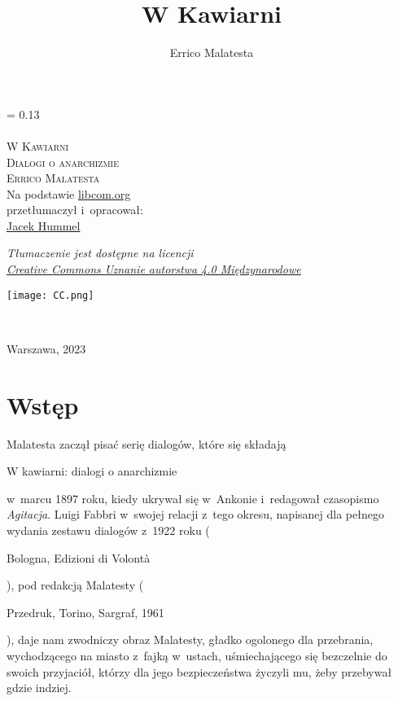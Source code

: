\documentclass[oneside,polish,11pt,sfheadings]{mwbk}
\begin{document}
\title{W Kawiarni}
\author{Errico Malatesta}


\DeclareRobustCommand{\cs}[1]{\texttt{\char`\\#1}}
\newlength{\tpheight}\setlength{\tpheight}{0.9\textheight}
\newlength{\txtheight}\setlength{\txtheight}{0.9\tpheight}
\newlength{\tpwidth}\setlength{\tpwidth}{0.9\textwidth}
\newlength{\txtwidth}\setlength{\txtwidth}{0.9\tpwidth}
\newlength{\drop}
\newcommand*{\titleSI}{\begingroup%
\drop = 0.13\txtheight
\centering
{\Huge \textsf{~}}\\[1\baselineskip]
{\huge \textsf{~}}\\[1\baselineskip]
{\Huge \textsc{W Kawiarni}}\\[1\baselineskip]
{\LARGE \textsc{Dialogi o anarchizmie}}\\[2\baselineskip]
{\huge \textsc{Errico Malatesta}}\\[4\baselineskip]
{\large Na podstawie \href{libcom.org}{libcom.org} \\ przetłumaczył i~opracował:}\\
{\Large \href{mailto:theskymyladythesky@zoho.eu}{Jacek Hummel}}\\[1\baselineskip]
{\normalsize \textit{Tłumaczenie jest dostępne na licencji\\
\href{https://creativecommons.org/licenses/by/4.0/deed.pl}{Creative Commons Uznanie autorstwa 4.0 Międzynarodowe}} \\ [1\baselineskip] \par}
\texttt{[image: CC.png]}

~

\vfill
{\Large {Warszawa, 2023}}\\
\endgroup}
\titleSI
\thispagestyle{empty}

\chapter*{Wstęp}
 



Malatesta zaczął pisać serię dialogów, które się składają \begin{itshape}W kawiarni: dialogi o anarchizmie \end{itshape} w~marcu 1897 roku, kiedy ukrywał się w~Ankonie i~redagował czasopismo
\textit{Agitacja}. Luigi Fabbri w~swojej relacji z~tego okresu, napisanej dla pełnego wydania zestawu dialogów z~1922 roku (\begin{itshape}Bologna, Edizioni di Volontà \end{itshape}), pod redakcją Malatesty
(\begin{itshape}Przedruk, Torino, Sargraf,
1961\end{itshape}), daje nam zwodniczy obraz Malatesty, gładko ogolonego dla przebrania, wychodzącego na
miasto z~fajką w~ustach, uśmiechającego się bezczelnie do swoich przyjaciół, którzy dla jego bezpieczeństwa życzyli mu,
żeby przebywał gdzie indziej. 
\end{document}
